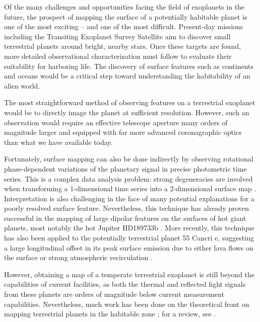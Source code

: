 \documentclass[modern]{aastex62}
\begin{document}
Of the many challenges and opportunities facing the field of exoplanets in the future, 
the prospect of mapping the surface of a potentially habitable planet is one of 
the most exciting -- and one of the most difficult. 
Present-day missions including the Transiting Exoplanet Survey Satellite 
\citep[\TESS; ][]{Ricker2015} aim to discover small terrestrial planets around 
bright, nearby stars. 
Once these targets are found, more detailed observational characterization 
must follow to evaluate their suitability for harboring life. 
The discovery of surface features such as continents and oceans would be a 
critical step toward understanding the habitability of an alien world.

The most straightforward method of observing features on a terrestrial exoplanet 
would be to directly image the planet at sufficient resolution. 
However, such an observation would require an effective telescope aperture many orders 
of magnitude larger and equipped with far more advanced coronagraphic optics
than what we have available today.

Fortunately, surface mapping can also be done indirectly by observing rotational 
phase-dependent variations of the planetary signal in precise photometric time series. 
This is a complex data analysis problem: strong degeneracies are involved when 
transforming a 1-dimensional time series into a 2-dimensional surface map
\citep{CowanFuentesHaggard2013}. 
Interpretation is also challenging in the face of many potential explanations 
for a poorly resolved surface feature. Nevertheless, this technique has
already proven successful in the mapping of large dipolar features on the surfaces
of hot giant planets, most notably the hot Jupiter HD189733b
\citep{Knutson2007,Majeau2012,deWit2012}. More recently, this technique has also
been applied to the potentially terrestrial planet 55 Cancri e, suggesting
a large longitudinal offset in its peak surface emission due to either
lava flows on the surface or strong atmospheric recirculation
\citep{Demory2016,Demory2016b,Hammond2017}.

However, obtaining a map of a temperate terrestrial exoplanet is still
beyond the capabilities of current facilities, as both the thermal and 
reflected light signals from these planets
are orders of magnitude below current measurement capabilities. Nevertheless,
much work has been done on the theoretical front on mapping terrestrial
planets in the habitable zone
\citep[e.g.,][]{Kawahara2010,Fujii2012,Berdyugina2017,Haggard2018,Lustig-Yaeger2018};
for a review, see \cite{Cowan2018}.
\end{document}
